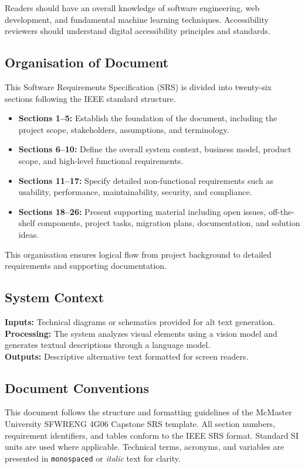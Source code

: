 \documentclass[12pt]{article}
\begin{document}
\noindent Readers should have an overall knowledge of software engineering, web
development, and fundamental machine learning techniques.
Accessibility reviewers should understand digital accessibility
principles and standards.

\subsection{Organisation of Document}
This Software Requirements Specification (SRS) is divided into
twenty-six sections following the IEEE standard structure.
\begin{itemize}
  \item \textbf{Sections 1–5:} Establish the foundation of the
    document, including the project scope, stakeholders, assumptions,
    and terminology.
  \item \textbf{Sections 6–10:} Define the overall system context,
    business model, product scope, and high-level functional requirements.
  \item \textbf{Sections 11–17:} Specify detailed non-functional
    requirements such as usability, performance, maintainability,
    security, and compliance.
  \item \textbf{Sections 18–26:} Present supporting material
    including open issues, off-the-shelf components, project tasks,
    migration plans, documentation, and solution ideas.
\end{itemize}
This organisation ensures logical flow from project background to
detailed requirements and supporting documentation.

\subsection{System Context}

\textbf{Inputs:} Technical diagrams or schematics provided for alt text generation. \\[2mm]
\textbf{Processing:} The system analyzes visual elements using a
vision model and generates textual descriptions through a language
model. \\[2mm]
\textbf{Outputs:} Descriptive alternative text formatted for screen
readers.

\subsection{Document Conventions}

This document follows the structure and formatting guidelines of the
McMaster University SFWRENG 4G06 Capstone SRS template.
All section numbers, requirement identifiers, and tables conform to
the IEEE SRS format.
Standard SI units are used where applicable.
Technical terms, acronyms, and variables are presented in
\texttt{monospaced} or \textit{italic} text for clarity.
\end{document}
